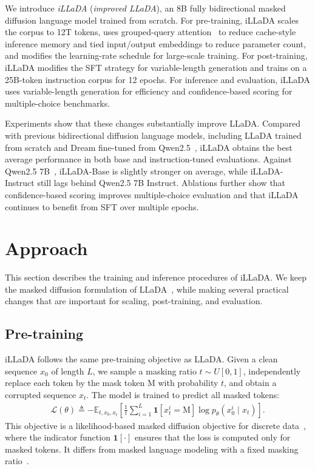 \documentclass{llmxive}
\begin{document}
We introduce \emph{iLLaDA} (\emph{improved LLaDA}), an 8B fully bidirectional masked diffusion language model trained from scratch. For pre-training, iLLaDA scales the corpus to 12T tokens, uses grouped-query attention~\citep{ainslie2023gqa} to reduce cache-style inference memory and tied input/output embeddings to reduce parameter count, and modifies the learning-rate schedule for large-scale training. For post-training, iLLaDA modifies the SFT strategy for variable-length generation and trains on a 25B-token instruction corpus for 12 epochs. For inference and evaluation, iLLaDA uses variable-length generation for efficiency and confidence-based scoring for multiple-choice benchmarks.

Experiments show that these changes substantially improve LLaDA. Compared with previous bidirectional diffusion language models, including LLaDA trained from scratch and Dream fine-tuned from Qwen2.5~\citep{ye2025dream}, iLLaDA obtains the best average performance in both base and instruction-tuned evaluations. Against Qwen2.5 7B~\citep{qwen2.5}, iLLaDA-Base is slightly stronger on average, while iLLaDA-Instruct still lags behind Qwen2.5 7B Instruct. Ablations further show that confidence-based scoring improves multiple-choice evaluation and that iLLaDA continues to benefit from SFT over multiple epochs.

\section{Approach}
\label{sec:approach}

This section describes the training and inference procedures of iLLaDA. We keep the masked diffusion formulation of LLaDA~\citep{austin2021structured,lou2023discrete,shi2024simplified,sahoo2024simple,ou2024your,nie2026large}, while making several practical changes that are important for scaling, post-training, and evaluation.

\subsection{Pre-training}
\label{sec:pretraining}

iLLaDA follows the same pre-training objective as LLaDA. Given a clean sequence \(x_0\) of length \(L\), we sample a masking ratio \(t \sim U[0, 1]\), independently replace each token by the mask token \(\textrm{M}\) with probability \(t\), and obtain a corrupted sequence \(x_t\). The model is trained to predict all masked tokens:
\begin{align}
\label{eq:pretrain-objective}
   \mathcal{L}(\theta)
   \triangleq
   -\mathbb{E}_{t, x_0, x_t}
   \left[
   \frac{1}{t}
   \sum_{i=1}^{L}
   \textbf{1}[x_t^i = \textrm{M}]
   \log p_{\theta}(x_0^i \mid x_t)
   \right].
\end{align}
This objective is a likelihood-based masked diffusion objective for discrete data~\citep{shi2024simplified,sahoo2024simple,ou2024your}, where the indicator function $\textbf{1}[\cdot]$ ensures that the loss is computed only for masked tokens. It differs from masked language modeling with a fixed masking ratio~\citep{devlin2018bert}.
\end{document}
